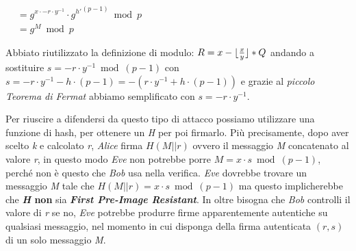 \begin{itemize}
\begin{enumerate}
\begin{center}
\begin{math}
\begin{aligned}
                    &= g^{x \cdot -r \cdot y^{-1}} \cdot {g^{h'}}^{(p - 1)} \bmod p \\
                    &= g^M \bmod p
                \end{aligned}
            \end{math}
        \end{center}
        Abbiato riutilizzato la definizione di modulo: $R = x - \lfloor\frac{x}{y}\rfloor * Q$ andando a sostituire $s = -r \cdot y^{-1} \bmod (p - 1)$ con $s = -r \cdot y^{-1} - h \cdot (p - 1) = - (r \cdot y^{-1} + h \cdot (p - 1))$ e grazie al \textit{piccolo Teorema di Fermat} abbiamo semplificato con $s = -r \cdot y^{-1}$. \\
    \end{enumerate}
\end{itemize}

Per riuscire a difendersi da questo tipo di attacco possiamo utilizzare una funzione di hash, per ottenere un \textit{H} per poi firmarlo. Più precisamente, dopo aver scelto \textit{k} e calcolato \textit{r}, \textit{Alice} firma $H(M||r)$ ovvero il messaggio \textit{M} concatenato al valore \textit{r}, in questo modo \textit{Eve} non potrebbe porre $M = x \cdot s \bmod (p - 1)$, perché non è questo che \textit{Bob} usa nella verifica. \textit{Eve} dovrebbe trovare un messaggio \textit{M} tale che $H(M||r) = x \cdot s \bmod (p - 1)$ ma questo implicherebbe che \textbf{\textit{H} non} sia \textbf{\textit{First Pre-Image Resistant}}. In oltre bisogna che \textit{Bob} controlli il valore di \textit{r} se no, \textit{Eve} potrebbe produrre firme apparentemente autentiche su qualsiasi messaggio, nel momento in cui disponga della firma autenticata $(r, s)$ di un solo messaggio \textit{M}.

\newpage
